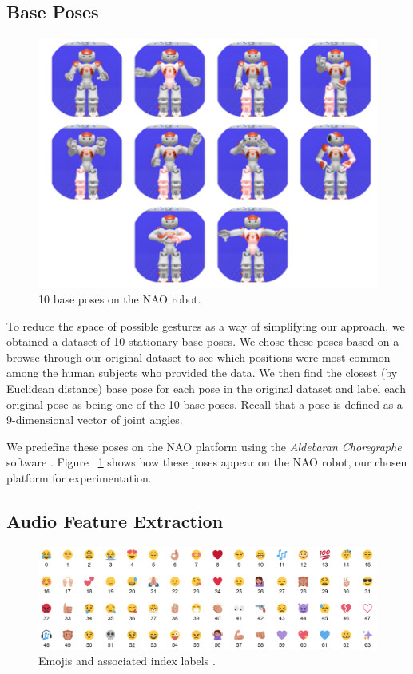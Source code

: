 \subsection{Base Poses}
\begin{figure}
\includegraphics[scale=0.5]{poses.png}
\caption{10 base poses on the NAO robot.}
\label{fig:baseposes}
\end{figure}

To reduce the space of possible gestures as a way of simplifying our approach, we obtained a dataset of 10 stationary base poses. We chose these poses based on a browse through our original dataset to see which positions were most common among the human subjects who provided the data. We then find the closest (by Euclidean distance) base pose for each pose in the original dataset and label each original pose as being one of the 10 base poses. Recall that a pose is defined as a 9-dimensional vector of joint angles.

We predefine these poses on the NAO platform using the \textit{Aldebaran Choregraphe} software \cite{choregraphe}. Figure ~\ref{fig:baseposes} shows how these poses appear on the NAO robot, our chosen platform for experimentation.

\subsection{Audio Feature Extraction}
\begin{figure}
\includegraphics[scale=0.25]{emoji_overview.png}
\caption{Emojis and associated index labels \cite{deepmojipaper:3}.}
\label{fig:emojis}
\end{figure}

